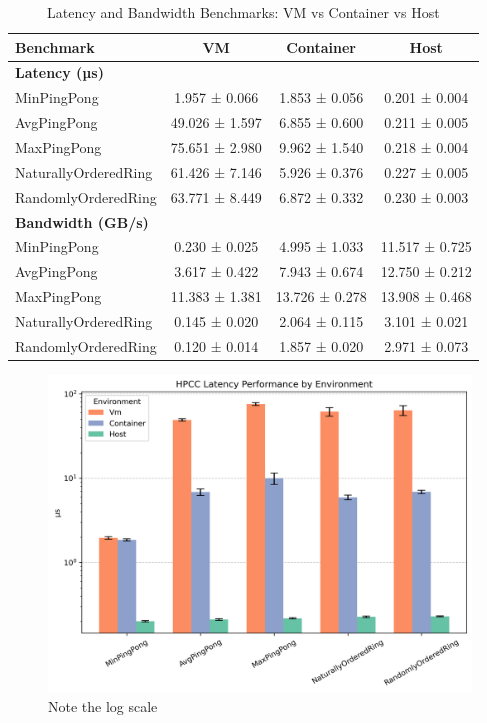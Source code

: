 \begin{table}[H]
\centering
\renewcommand{\arraystretch}{1.2}
\begin{tabular}{lccc}
\toprule
\textbf{Benchmark} & \textbf{VM} & \textbf{Container} & \textbf{Host} \\
\midrule
\multicolumn{4}{l}{\textbf{Latency (µs)}} \\
MinPingPong             & 1.957 ± 0.066 & 1.853 ± 0.056 & 0.201 ± 0.004 \\
AvgPingPong              & 49.026 ± 1.597 & 6.855 ± 0.600 & 0.211 ± 0.005 \\
MaxPingPong              & 75.651 ± 2.980 & 9.962 ± 1.540 & 0.218 ± 0.004 \\
NaturallyOrderedRing    & 61.426 ± 7.146 & 5.926 ± 0.376 & 0.227 ± 0.005 \\
RandomlyOrderedRing     & 63.771 ± 8.449 & 6.872 ± 0.332 & 0.230 ± 0.003 \\
\midrule
\multicolumn{4}{l}{\textbf{Bandwidth (GB/s)}} \\
MinPingPong            & 0.230 ± 0.025 & 4.995 ± 1.033 & 11.517 ± 0.725 \\
AvgPingPong            & 3.617 ± 0.422 & 7.943 ± 0.674 & 12.750 ± 0.212 \\
MaxPingPong            & 11.383 ± 1.381 & 13.726 ± 0.278 & 13.908 ± 0.468 \\
NaturallyOrderedRing  & 0.145 ± 0.020 & 2.064 ± 0.115 & 3.101 ± 0.021 \\
RandomlyOrderedRing   & 0.120 ± 0.014 & 1.857 ± 0.020 & 2.971 ± 0.073 \\
\bottomrule
\end{tabular}
\label{tab:pingpong}
\caption{Latency and Bandwidth Benchmarks: VM vs Container vs Host}

\end{table}

\begin{figure}[H]
    \centering
    \includegraphics[width=0.8\linewidth]{assets/hpcc_latency_performance.png}
    \caption{Note the log scale}
    \label{fig:enter-label}
\end{figure}


